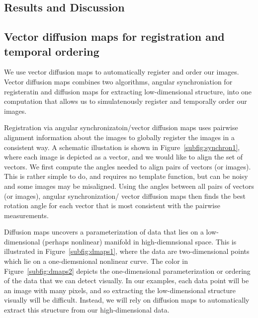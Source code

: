 \documentclass{pnastwo}
\begin{document}
\begin{article}
\section{Results and Discussion}



\subsection{Vector diffusion maps for registration and temporal ordering}

We use vector diffusion maps \cite{singer2012vector} to automatically register and order our images.
%
Vector diffusion maps combines two algorithms, angular synchroniation \cite{singer2011angular} for registeratin and diffusion maps \cite{coifman2005geometric} for extracting low-dimensional structure, into one computation that allows us to simulatenously register and temporally order our images. 

Registration via angular synchronizatoin/vector diffusion maps uses pairwise alignment information about the images to globally register the images in a consistent way.
%
A schematic illustation is shown in Figure~\ref{subfig:synchron1}, where each image is depicted as a vector, and we would like to align the set of vectors. 
%
We first compute the angles needed to align pairs of vectors (or images).%
This is rather simple to do, and requires no template function, but can be noisy and some images may be misaligned.
%
Using the angles between all pairs of vectors (or images), angular synchronization/ vector diffusion maps then finds the best rotation angle for each vector that is most consistent with the pairwise measurements.

Diffusion maps \cite{coifman2005geometric} uncovers a parameterization of data that lies on a low-dimensional (perhaps nonlinear) manifold in high-diemnsional space. 
%
This is illustrated in Figure~\ref{subfig:dmaps1}, where the data are two-dimensional points which lie on a one-diemsnional nonlinear curve. 
%
The color in Figure~\ref{subfig:dmaps2} depicts the one-dimensional parameterization or ordering of the data that we can detect visually.
%
In our examples, each data point will be an image with many pixels, and so extracting the low-dimensional structure visually will be difficult.
%
Instead, we will rely on diffusion maps to automatically extract this structure from our high-dimensional data.


\end{article}
\end{document}
